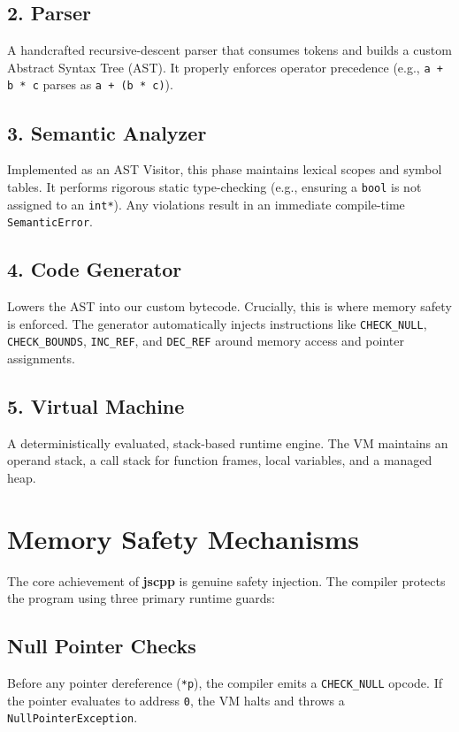 \documentclass[12pt, a4paper]{article}
\begin{document}
\subsection{2. Parser}
A handcrafted recursive-descent parser that consumes tokens and builds a custom Abstract Syntax Tree (AST). It properly enforces operator precedence (e.g., \texttt{a + b * c} parses as \texttt{a + (b * c)}).

\subsection{3. Semantic Analyzer}
Implemented as an AST Visitor, this phase maintains lexical scopes and symbol tables. It performs rigorous static type-checking (e.g., ensuring a \texttt{bool} is not assigned to an \texttt{int*}). Any violations result in an immediate compile-time \texttt{SemanticError}.

\subsection{4. Code Generator}
Lowers the AST into our custom bytecode. Crucially, this is where memory safety is enforced. The generator automatically injects instructions like \texttt{CHECK\_NULL}, \texttt{CHECK\_BOUNDS}, \texttt{INC\_REF}, and \texttt{DEC\_REF} around memory access and pointer assignments.

\subsection{5. Virtual Machine}
A deterministically evaluated, stack-based runtime engine. The VM maintains an operand stack, a call stack for function frames, local variables, and a managed heap.

\section{Memory Safety Mechanisms}
The core achievement of \textbf{jscpp} is genuine safety injection. The compiler protects the program using three primary runtime guards:

\subsection{Null Pointer Checks}
Before any pointer dereference (\texttt{*p}), the compiler emits a \texttt{CHECK\_NULL} opcode. If the pointer evaluates to address \texttt{0}, the VM halts and throws a \texttt{NullPointerException}.
\end{document}
